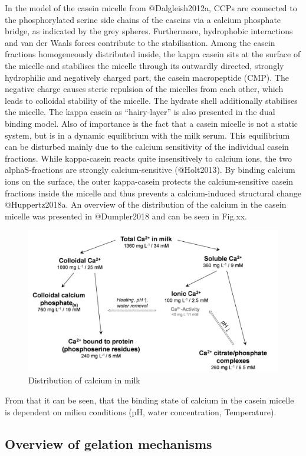 \documentclass[
]{article}
\begin{document}
In the model of the casein micelle from @Dalgleish2012a, CCPs are
connected to the phosphorylated serine side chains of the caseins via a
calcium phosphate bridge, as indicated by the grey spheres. Furthermore,
hydrophobic interactions and van der Waals forces contribute to the
stabilisation. Among the casein fractions homogeneously distributed
inside, the kappa casein sits at the surface of the micelle and
stabilises the micelle through its outwardly directed, strongly
hydrophilic and negatively charged part, the casein macropeptide (CMP).
The negative charge causes steric repulsion of the micelles from each
other, which leads to colloidal stability of the micelle. The hydrate
shell additionally stabilises the micelle. The kappa casein as
``hairy-layer'' is also presented in the dual binding model. Also of
importance is the fact that a casein micelle is not a static system, but
is in a dynamic equilibrium with the milk serum. This equilibrium can be
disturbed mainly due to the calcium sensitivity of the individual casein
fractions. While kappa-casein reacts quite insensitively to calcium
ions, the two alphaS-fractions are strongly calcium-sensitive
(@Holt2013). By binding calcium ions on the surface, the outer
kappa-casein protects the calcium-sensitive casein fractions inside the
micelle and thus prevents a calcium-induced structural change
@Huppertz2018a. An overview of the distribution of the calcium in the
casein micelle was presented in @Dumpler2018 and can be seen in Fig.xx.

\begin{figure}
\includegraphics[width=0.75\linewidth]{images/calcium_dumpler} \caption{Distribution of calcium in milk}\label{fig:unnamed-chunk-4}
\end{figure}

From that it can be seen, that the binding state of calcium in the
casein micelle is dependent on milieu conditions (pH, water
concentration, Temperature).

\subsection{Overview of gelation mechanisms}
\end{document}
